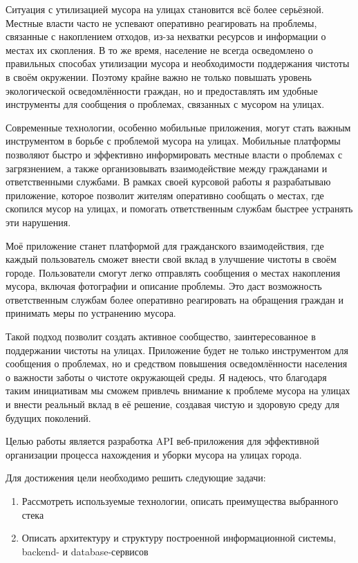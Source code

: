 \documentclass[otchet]{SCWorks}
\begin{document}
Ситуация с утилизацией мусора на улицах становится всё более серьёзной. 
Местные власти часто не успевают оперативно реагировать на проблемы, связанные 
с накоплением отходов, из-за нехватки ресурсов и информации о местах их 
скопления. В то же время, население не всегда осведомлено о правильных 
способах утилизации мусора и необходимости поддержания чистоты в своём 
окружении. Поэтому крайне важно не только повышать уровень экологической 
осведомлённости граждан, но и предоставлять им удобные инструменты для 
сообщения о проблемах, связанных с мусором на улицах.

Современные технологии, особенно мобильные приложения, могут стать важным 
инструментом в борьбе с проблемой мусора на улицах. Мобильные платформы 
позволяют быстро и эффективно информировать местные власти о проблемах с 
загрязнением, а также организовывать взаимодействие между гражданами и 
ответственными службами. В рамках своей курсовой работы я разрабатываю 
приложение, которое позволит жителям оперативно сообщать о местах, где 
скопился мусор на улицах, и помогать ответственным службам быстрее устранять 
эти нарушения.

Моё приложение станет платформой для гражданского взаимодействия, где каждый 
пользователь сможет внести свой вклад в улучшение чистоты в своём городе. 
Пользователи смогут легко отправлять сообщения о местах накопления мусора, 
включая фотографии и описание проблемы. Это даст возможность ответственным 
службам более оперативно реагировать на обращения граждан и принимать меры по 
устранению мусора.

Такой подход позволит создать активное сообщество, заинтересованное в 
поддержании чистоты на улицах. Приложение будет не только инструментом для 
сообщения о проблемах, но и средством повышения осведомлённости населения о 
важности заботы о чистоте окружающей среды. Я надеюсь, что благодаря таким 
инициативам мы сможем привлечь внимание к проблеме мусора на улицах и внести 
реальный вклад в её решение, создавая чистую и здоровую среду для будущих 
поколений.

Целью работы является разработка API веб-приложения для эффективной организации
процесса нахождения и уборки мусора на улицах города.

Для достижения цели необходимо решить следующие задачи:
\begin{enumerate}
    \item Рассмотреть используемые технологии, описать преимущества выбранного 
    стека
    \item Описать архитектуру и структуру построенной информационной системы, 
    backend- и database-сервисов
\end{enumerate}
\end{document}
